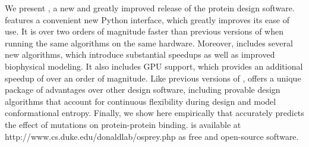We present , a new and greatly improved release of the \osprey protein design software.   features a convenient new Python interface, which greatly improves its ease of use.  It is over two orders of magnitude faster than previous versions of \osprey when running the same algorithms on the same hardware.  Moreover,  includes several new algorithms, which introduce substantial speedups as well as improved biophysical modeling.  It also includes GPU support, which provides an additional speedup of over an order of magnitude.  Like previous versions of \osprey,  offers a unique package of advantages over other design software, including provable design algorithms that account for continuous flexibility during design and model conformational entropy.  Finally, we show here empirically that  accurately predicts the effect of mutations on protein-protein binding.  is available at http://www.cs.duke.edu/donaldlab/osprey.php as free and open-source software.    
